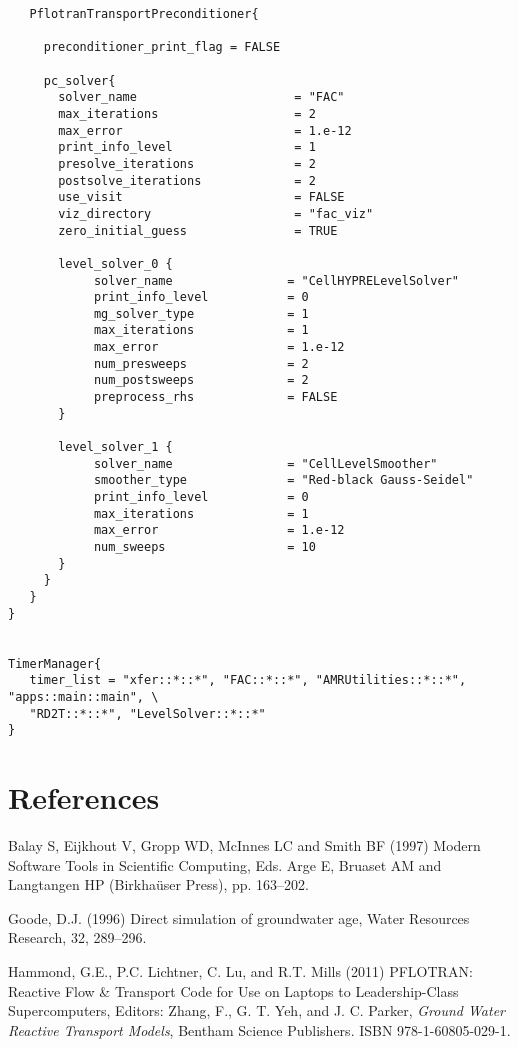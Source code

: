 \documentclass[12pt]{article}
\begin{document}
\begin{verbatim}
   PflotranTransportPreconditioner{

     preconditioner_print_flag = FALSE

     pc_solver{
       solver_name                      = "FAC"
       max_iterations                   = 2 
       max_error                        = 1.e-12
       print_info_level                 = 1 
       presolve_iterations              = 2
       postsolve_iterations             = 2
       use_visit                        = FALSE
       viz_directory                    = "fac_viz"
       zero_initial_guess               = TRUE

       level_solver_0 {
            solver_name                = "CellHYPRELevelSolver"
            print_info_level           = 0 
            mg_solver_type             = 1
            max_iterations             = 1
            max_error                  = 1.e-12
            num_presweeps              = 2
            num_postsweeps             = 2
            preprocess_rhs             = FALSE
       }

       level_solver_1 {
            solver_name                = "CellLevelSmoother"
            smoother_type              = "Red-black Gauss-Seidel"
            print_info_level           = 0 
            max_iterations             = 1
            max_error                  = 1.e-12
            num_sweeps                 = 10
       }
     } 
   }
}


TimerManager{
   timer_list = "xfer::*::*", "FAC::*::*", "AMRUtilities::*::*", "apps::main::main", \
   "RD2T::*::*", "LevelSolver::*::*"
}
\end{verbatim}

\normalsize
\section{References}

\begin{description}

\item Balay S, Eijkhout V, Gropp WD, McInnes LC and Smith BF (1997) Modern Software Tools in Scientific Computing, Eds. Arge E, Bruaset AM and Langtangen HP (Birkha\"user Press), pp. 163--202.

\item Goode, D.J. (1996) Direct simulation of groundwater age, Water Resources Research, 32, 289--296.

\item Hammond, G.E., P.C. Lichtner, C. Lu, and R.T. Mills (2011) PFLOTRAN: Reactive Flow \& Transport Code for Use on Laptops to Leadership-Class Supercomputers, Editors: Zhang, F., G. T. Yeh, and J. C. Parker,
{\em Ground Water Reactive Transport Models},
Bentham Science Publishers.
ISBN 978-1-60805-029-1. 

\end{description}
\end{document}
